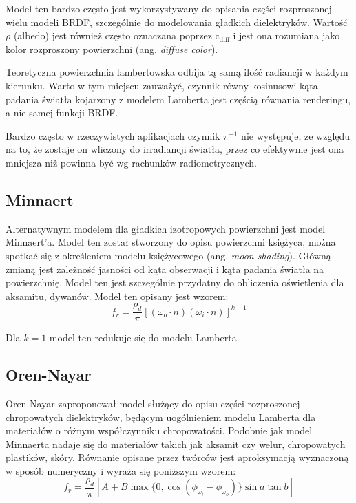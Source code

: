 \documentclass[../main.tex]{subfiles}
\begin{document}
Model ten bardzo często jest wykorzystywany do opisania części rozproszonej wielu modeli BRDF, szczególnie do modelowania gładkich dielektryków. Wartość $\rho$ (albedo) jest również często oznaczana poprzez $\text{c}_{\text{diff}}$ i jest ona rozumiana jako kolor rozproszony powierzchni (ang. \textit{diffuse color}).

Teoretyczna powierzchnia lambertowska odbija tą samą ilość radiancji w każdym kierunku. Warto w tym miejscu zauważyć, czynnik równy kosinusowi kąta padania światła kojarzony z modelem Lamberta jest częścią równania renderingu, a nie samej funkcji BRDF.

Bardzo często w rzeczywistych aplikacjach czynnik $\pi^{-1}$ nie występuje, ze względu na to, że zostaje on wliczony do irradiancji światła, przez co efektywnie jest ona mniejsza niż powinna być wg rachunków radiometrycznych. 

\subsection{Minnaert}

Alternatywnym modelem dla gładkich izotropowych powierzchni jest model
Minnaert'a. Model ten został stworzony do opisu powierzchni księżyca, można
spotkać się z określeniem modelu księżycowego (ang. \textit{moon shading}).
Główną zmianą jest zależność jasności od kąta obserwacji i kąta padania światła
na powierzchnię.  Model ten jest szczególnie przydatny do obliczenia
oświetlenia dla aksamitu, dywanów. Model ten opisany jest wzorem:
\[
  f_r = \frac{\rho_d}{\pi} \left[
    (\omega_o \cdot n) (\omega_i \cdot n)
  \right]^{k-1}
\]

\noindent Dla $k=1$ model ten redukuje się do modelu Lamberta.

\subsection{Oren-Nayar}

Oren-Nayar zaproponował model służący do opisu części rozproszonej chropowatych
dielektryków, będącym uogólnieniem modelu Lamberta dla materiałów o różnym
współczynniku chropowatości. Podobnie jak model Minnaerta nadaje się do
materiałów takich jak aksamit czy welur, chropowatych plastików,
skóry. Równanie opisane przez twórców jest aproksymacją wyznaczoną w sposób numeryczny i wyraża się poniższym
wzorem:
\[
  f_r = \frac{\rho_d}{\pi} \left[
    A +
    B
      \max\{ 0, \cos\left(\phi_{\omega_i} - \phi_{\omega_o}\right) \}
      \sin a \tan b
  \right]
\]
\end{document}

